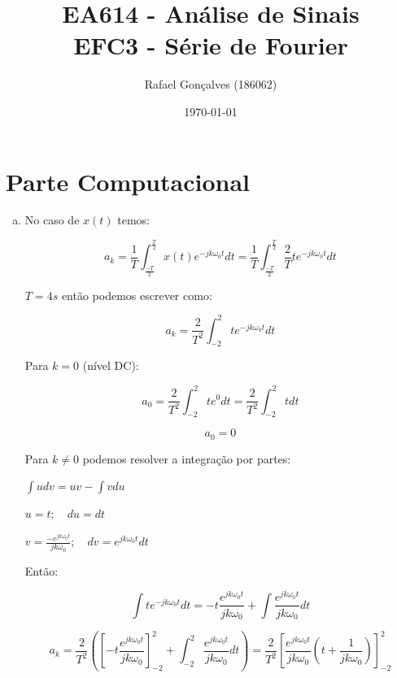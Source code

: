 \documentclass{article}
\begin{document}
\title{EA614 - Análise de Sinais \\
\large{EFC3 - Série de Fourier}}
\author{Rafael Gonçalves (186062)}
\date{\today}

\maketitle

\section{Parte Computacional}

\begin{enumerate}[(a)]
    \item
No caso de $x(t)$ temos:

\begin{equation}
a_{k} = \frac{1}{T}\int_{\frac{-T}{2}}^{\frac{T}{2}}x(t)e^{-jk\omega_{0}t}dt = \frac{1}{T}\int_{\frac{-T}{2}}^{\frac{T}{2}}\frac{2}{T}te^{-jk\omega_{0}t}dt
\end{equation}

$T = 4s$ então podemos escrever como:

\begin{equation}
    a_k = \frac{2}{T^{2}}\int_{-2}^{2}te^{-jk\omega_{0}t}dt
\end{equation}

Para $k = 0$ (nível DC):

\begin{equation}
    a_0 = \frac{2}{T^{2}}\int_{-2}^{2}te^{0}dt = \frac{2}{T^{2}}\int_{-2}^{2}tdt 
\end{equation}

\[
    \boxed{a_0 = 0}
\]

Para $k \neq 0$ podemos resolver a integração por partes:

\begin{center}
    $\int u dv = u v - \int v du$\break

    $u = t ; \quad  du = dt$\break

   $v = \frac{-e^{jk\omega_0t}}{jk\omega_0}; \quad dv = e^{jk\omega_0t}dt$
\end{center}
Então:

\begin{equation}
    \int te^{-jk\omega_{0}t}dt = -t \frac{e^{jk\omega_0t}}{jk\omega_0} + \int \frac{e^{jk\omega_0t}}{jk\omega_0} dt 
\end{equation}

\begin{equation}
    a_k = \frac{2}{T^2} \left ( \left [ - t\frac{e^{jk\omega_0t}}{jk\omega_0} \right ]_{-2}^2 + \int_{-2}^2 \frac{e^{jk\omega_0t}}{jk\omega_0}dt \right )= \frac{2}{T^2} \left [ \frac{e^{jk\omega_0t}}{jk\omega_0} \left ( t + \frac{1}{jk\omega_0} \right ) \right ] _{-2}^2
\end{equation}


\end{enumerate}
\end{document}
